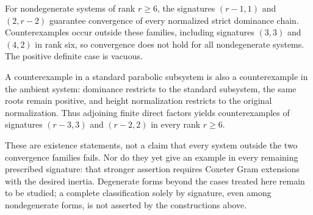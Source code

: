 \documentclass[11pt,reqno]{amsart}
\theoremstyle{plain}
\theoremstyle{definition}
\theoremstyle{remark}
\numberwithin{equation}{section}
\begin{document}
For nondegenerate systems of rank $r\geq6$, the signatures $(r-1,1)$ and $(2,r-2)$ guarantee convergence of every normalized strict dominance chain. Counterexamples occur outside these families, including signatures $(3,3)$ and $(4,2)$ in rank six, so convergence does not hold for all nondegenerate systems. The positive definite case is vacuous.

A counterexample in a standard parabolic subsystem is also a counterexample in the ambient system: dominance restricts to the standard subsystem, the same roots remain positive, and height normalization restricts to the original normalization. Thus adjoining finite direct factors yields counterexamples of signatures $(r-3,3)$ and $(r-2,2)$ in every rank $r\geq6$.

These are existence statements, not a claim that every system outside the two convergence families fails. Nor do they yet give an example in every remaining prescribed signature: that stronger assertion requires Coxeter Gram extensions with the desired inertia. Degenerate forms beyond the cases treated here remain to be studied; a complete classification solely by signature, even among nondegenerate forms, is not asserted by the constructions above.



\end{document}
